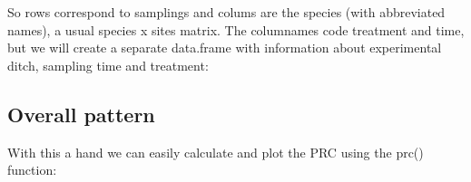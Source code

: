 \documentclass{tufte-book}\usepackage{knitr}
\begin{document}
So rows correspond to samplings and colums are the species (with abbreviated 
names), a usual species x sites matrix. The columnames code treatment and time, 
but we will create a separate data.frame with information about experimental 
ditch, sampling time and treatment: 

\begin{knitrout}
\color{fgcolor}\begin{kframe}
\begin{alltt}
 \hlkwb{<-} \hlstd{(}\hlstd{,} \hlstd{,}  \hlstd{=} \hlstd{)}
 \hlkwb{<-} \hlstd{(}\hlstd{,} \hlstd{,}  \hlstd{=} \hlstd{(}\hlopt{-}\hlstd{,} \hlopt{-}\hlstd{,} \hlstd{,} \hlstd{,} \hlstd{,} \hlstd{,} \hlstd{,} \hlstd{,}
    \hlstd{,} \hlstd{,} \hlstd{))}
 \hlkwb{<-} \hlstd{(}\hlstd{(}\hlstd{(}\hlstd{,} \hlstd{,} \hlstd{,} \hlstd{,} \hlstd{,} \hlstd{,} \hlstd{,} \hlstd{,} \hlstd{,}
    \hlstd{,} \hlstd{,} \hlstd{),} \hlstd{))}
 \hlkwb{<-} 
\end{alltt}
\end{kframe}
\end{knitrout}



\subsection{Overall pattern}
With this a hand we can easily calculate and plot  the PRC using the prc() function:

\begin{knitrout}
\color{fgcolor}\begin{kframe}
\begin{alltt}
 \hlkwb{<-} \hlstd{(}   
     
 \hlkwb{<-}   \hlstd{=} \hlstd{)}
\end{alltt}
\end{kframe}
\end{knitrout}
\end{document}
